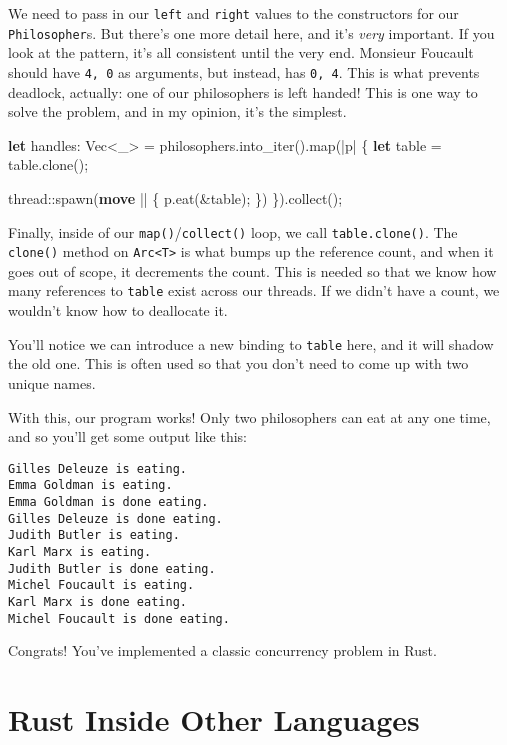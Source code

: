 \documentclass[a4paper,]{book}
\newenvironment{Shaded}{\begin{snugshade}}{\end{snugshade}}
\newcommand{\KeywordTok}[1]{\textcolor[rgb]{0.13,0.29,0.53}{\textbf{{#1}}}}
\newcommand{\DataTypeTok}[1]{\textcolor[rgb]{0.13,0.29,0.53}{{#1}}}
\newcommand{\NormalTok}[1]{{#1}}
\begin{document}
We need to pass in our \texttt{left} and \texttt{right} values to the
constructors for our \texttt{Philosopher}s. But there's one more detail
here, and it's \emph{very} important. If you look at the pattern, it's
all consistent until the very end. Monsieur Foucault should have
\texttt{4,\ 0} as arguments, but instead, has \texttt{0,\ 4}. This is
what prevents deadlock, actually: one of our philosophers is left
handed! This is one way to solve the problem, and in my opinion, it's
the simplest.

\begin{Shaded}
\begin{Highlighting}[]
\KeywordTok{let} \NormalTok{handles: }\DataTypeTok{Vec}\NormalTok{<_> = philosophers.into_iter().map(|p| \{}
    \KeywordTok{let} \NormalTok{table = table.clone();}

    \NormalTok{thread::spawn(}\KeywordTok{move} \NormalTok{|| \{}
        \NormalTok{p.eat(&table);}
    \NormalTok{\})}
\NormalTok{\}).collect();}
\end{Highlighting}
\end{Shaded}

Finally, inside of our \texttt{map()}/\texttt{collect()} loop, we call
\texttt{table.clone()}. The \texttt{clone()} method on
\texttt{Arc\textless{}T\textgreater{}} is what bumps up the reference
count, and when it goes out of scope, it decrements the count. This is
needed so that we know how many references to \texttt{table} exist
across our threads. If we didn't have a count, we wouldn't know how to
deallocate it.

You'll notice we can introduce a new binding to \texttt{table} here, and
it will shadow the old one. This is often used so that you don't need to
come up with two unique names.

With this, our program works! Only two philosophers can eat at any one
time, and so you'll get some output like this:

\begin{verbatim}
Gilles Deleuze is eating.
Emma Goldman is eating.
Emma Goldman is done eating.
Gilles Deleuze is done eating.
Judith Butler is eating.
Karl Marx is eating.
Judith Butler is done eating.
Michel Foucault is eating.
Karl Marx is done eating.
Michel Foucault is done eating.
\end{verbatim}

Congrats! You've implemented a classic concurrency problem in Rust.

\section{Rust Inside Other
Languages}\label{sec--rust-inside-other-languages}
\end{document}

